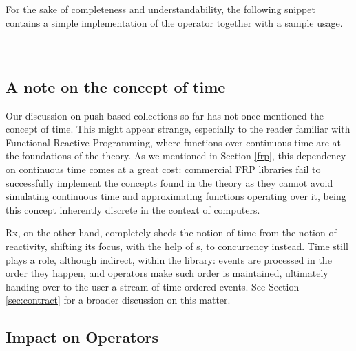For the sake of completeness and understandability, the following snippet contains a simple implementation of the  operator together with a sample usage.\\

\\

\\


\subsection{A note on the concept of time}

Our discussion on push-based collections so far has not once mentioned the concept of time. This might appear strange, especially to the reader familiar with Functional Reactive Programming, where functions over continuous time are at the foundations of the theory. As we mentioned in Section \ref{frp}, this dependency on continuous time comes at a great cost: commercial FRP libraries fail to successfully implement the concepts found in the theory as they cannot avoid simulating continuous time and approximating functions operating over it, being this concept inherently discrete in the context of computers.

Rx, on the other hand, completely sheds the notion of time from the notion of reactivity\cite{meijer2010observable}, shifting its focus, with the help of s, to concurrency instead. Time still plays a role, although indirect, within the library: events are processed in the order they happen, and operators make such order is maintained, ultimately handing over to the user a stream of time-ordered events. See Section \ref{sec:contract} for a broader discussion on this matter.

\subsection{Impact on Operators}

